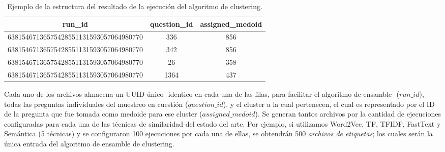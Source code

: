 \begin{table}[h!]
	\footnotesize
	\caption{Ejemplo de la estructura del resultado de la ejecución del algoritmo de clustering.}
	\begin{tabularx}{\textwidth}{ccc}
		\toprule
		\textbf{run\_id}                       & \textbf{question\_id} & \textbf{assigned\_medoid} \\
		\midrule
		63815467136575428551131593057064980770 & 336 & 856  \\
		63815467136575428551131593057064980770 & 342& 856 \\
		63815467136575428551131593057064980770 & 26 & 358 \\
		63815467136575428551131593057064980770 & 1364 & 437 \\
		\bottomrule
	\end{tabularx}
	\label{tab:salida-clustering}
\end{table}
Cada uno de los archivos almacena un UUID único -identico en cada una de las filas, para facilitar el algoritmo de ensamble- (\(run\_id\)), todas las preguntas individuales del muestreo en cuestión (\(question\_id\)), y el cluster a la cual pertenecen, el cual es representado por el ID de la pregunta que fue tomada como medoide para ese cluster (\(assigned\_medoid\)). Se generan tantos archivos por la cantidad de ejecuciones configuradas para cada una de las técnicas de similaridad del estado del arte. Por ejemplo, si utilizamos Word2Vec, TF, TFIDF, FastText y Semántica (5 técnicas) y se configuraron 100 ejecuciones por cada una de ellas, se obtendrán 500 \textit{archivos de etiquetas}; los cuales serán la única entrada del algoritmo de ensamble de clustering.





